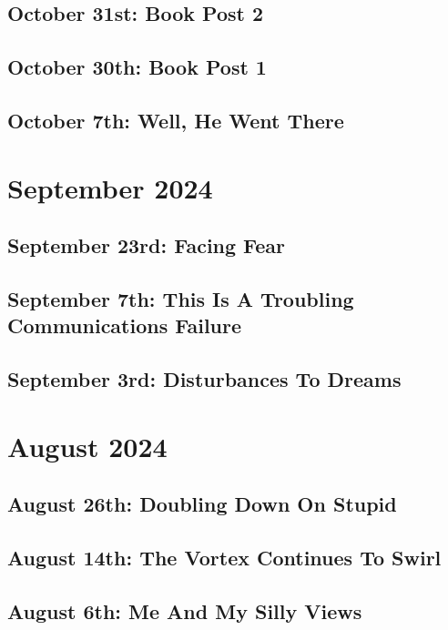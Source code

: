 \documentclass[12pt,letterpaper]{report}
\begin{document}
\subsection{October 31st: Book Post 2}

\subsection{October 30th: Book Post 1}

\subsection{October 7th: Well, He Went There}

\section{September 2024}
\subsection{September 23rd: Facing Fear}

\subsection{September 7th: This Is A Troubling Communications Failure}

\subsection{September 3rd: Disturbances To Dreams}

\section{August 2024}
\subsection{August 26th: Doubling Down On Stupid}

\subsection{August 14th: The Vortex Continues To Swirl}

\subsection{August 6th: Me And My Silly Views}

\end{document}
